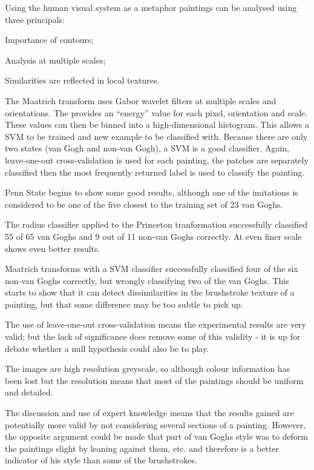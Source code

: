 \documentclass[conference]{IEEEtran}
\begin{document}
Using the human visual system as a metaphor paintings can be analysed using
three principals: 
\begin{inparaenum}[1)]
\item Importance of contours;
\item Analysis at multiple scales;
\item Similarities are reflected in local textures.
\end{inparaenum}

The Maatrich transform uses Gabor wavelet filters at multiple scales and
orientations. The provides an ``energy'' value for each pixel, orientation and
scale. These values can then be binned into a high-dimensional histogram. This
allows a \gls{SVM} to be trained and new example to be classified
with. Because there are only two states (van Gogh and non-van Gogh), a
\gls{SVM} is a good classifier. Again, leave-one-out cross-validation is used
for each painting, the patches are separately classified then the most
frequently returned label is used to classify the painting.

Penn State begins to show some good results, although one of the imitations is
considered to be one of the five closest to the training set of 23 van Goghs.

The radius classifier applied to the Princeton tranformation successfully
classified 55 of 65 van Goghs and 9 out of 11 non-van Goghs correctly. At even
finer scale shows even better results.

Maatrich transforms with a \gls{SVM} classifier successfully classified four of
the six non-van Goghs correctly, but wrongly classifying two of the van Goghs.
This starts to show that it can detect dissimilarities in the brushstroke
texture of a painting, but that some difference may be too subtle to pick up.

The use of leave-one-out cross-validation means the experimental results are
very valid; but the lack of significance does remove some of this validity - it
is up for debate whether a null hypothesis could also be to play.

The images are high resolution greyscale, so although colour information has
been lost but the resolution means that most of the paintings should be uniform
and detailed.

The discussion and use of expert knowledge means that the results gained are
potentially more valid by not considering several sections of a painting.
However, the opposite argument could be made that part of van Goghs style was
to deform the paintings slight by leaning against them, etc. and therefore is a
better indicator of his style than some of the brushstrokes.
\end{document}
